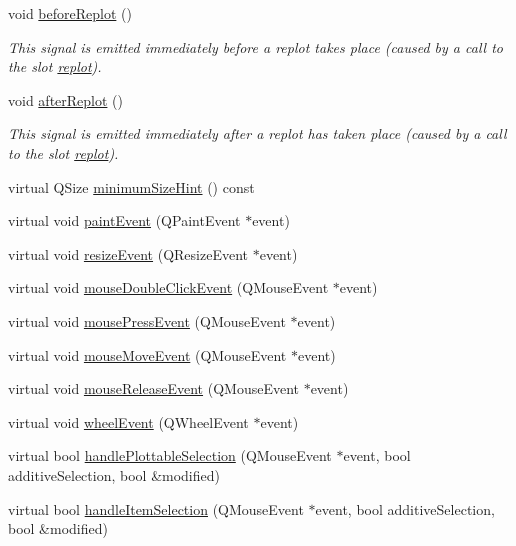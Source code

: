 \begin{DoxyCompactItemize}
void \hyperlink{a00116_a0cd30e29b73efd6afe096e44bc5956f5}{before\+Replot} ()
\begin{DoxyCompactList}\small\item\em This signal is emitted immediately before a replot takes place (caused by a call to the slot \hyperlink{a00116_a563540b54b2a09c8ef092d42e9621f42}{replot}). \end{DoxyCompactList}\item 
void \hyperlink{a00116_a6f4fa624af060bc5919c5f266cf426a0}{after\+Replot} ()
\begin{DoxyCompactList}\small\item\em This signal is emitted immediately after a replot has taken place (caused by a call to the slot \hyperlink{a00116_a563540b54b2a09c8ef092d42e9621f42}{replot}). \end{DoxyCompactList}\item 
virtual Q\+Size \hyperlink{a00116_a4904f06d831afae29cd5d10e889388c3}{minimum\+Size\+Hint} () const 
\item 
virtual void \hyperlink{a00116_a2bbc3b1c24bfcc8a7cc1f3008cdd9b73}{paint\+Event} (Q\+Paint\+Event $\ast$event)
\item 
virtual void \hyperlink{a00116_a13e05523a40c3f08875df5cde85cf0d9}{resize\+Event} (Q\+Resize\+Event $\ast$event)
\item 
virtual void \hyperlink{a00116_a467e30feeea8ec0dd35f19ca32a55ba7}{mouse\+Double\+Click\+Event} (Q\+Mouse\+Event $\ast$event)
\item 
virtual void \hyperlink{a00116_a460b092e82c0eb94ef6c32a10acc822a}{mouse\+Press\+Event} (Q\+Mouse\+Event $\ast$event)
\item 
virtual void \hyperlink{a00116_ac64727a4f442770f6e5e6be2d0530843}{mouse\+Move\+Event} (Q\+Mouse\+Event $\ast$event)
\item 
virtual void \hyperlink{a00116_a724e97d2e8c03e68adac5f4b6164a1b3}{mouse\+Release\+Event} (Q\+Mouse\+Event $\ast$event)
\item 
virtual void \hyperlink{a00116_a7b8bd7e8d3a1d23a8595e9c6a6b76ef1}{wheel\+Event} (Q\+Wheel\+Event $\ast$event)
\item 
virtual bool \hyperlink{a00116_a881c8652ebb912345de27687817845cf}{handle\+Plottable\+Selection} (Q\+Mouse\+Event $\ast$event, bool additive\+Selection, bool \&modified)
\item 
virtual bool \hyperlink{a00116_aa1ad9839539b4cdf9f7da768336650f2}{handle\+Item\+Selection} (Q\+Mouse\+Event $\ast$event, bool additive\+Selection, bool \&modified)
\item 

\end{DoxyCompactItemize}
